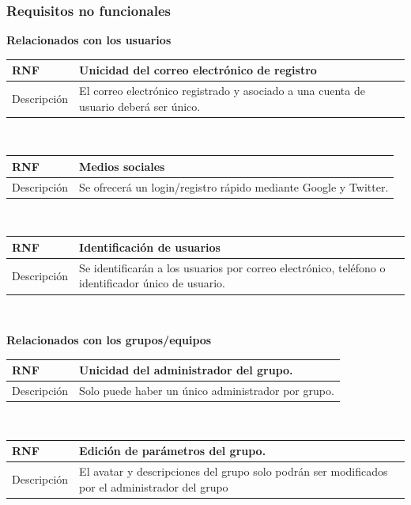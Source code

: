 \documentclass[twoside]{report}
\newcommand\addrow[2]{#1 &#2\\ }
\newcommand\addheading[2]{#1 &#2\\ \hline}
\newcommand\tabularhead{\begin{tabular}{lp{0.7\textwidth}}
\hline
}
\newenvironment{req}{\tabularhead}
{\hline\end{tabular}}
\begin{document}
\subsubsection{Requisitos no funcionales}



\textbf{Relacionados con los usuarios}\\

\begin{req}
	\addheading{\textbf{RNF\arabic{nonFunctionalRequirements}}}{Unicidad del correo electrónico de registro}
	\addrow{Descripción}{El correo electrónico registrado y asociado a una cuenta de usuario deberá ser único.}
\end{req}\\

\begin{req}
	\addheading{\textbf{RNF\arabic{nonFunctionalRequirements}}}{Medios sociales}
	\addrow{Descripción}{Se ofrecerá un login/registro rápido mediante Google y Twitter.}
\end{req}\\

\begin{req}
	\addheading{\textbf{RNF\arabic{nonFunctionalRequirements}}}{Identificación de usuarios}
	\addrow{Descripción}{Se identificarán a los usuarios por correo electrónico, teléfono o identificador único de usuario.}
\end{req}\\

\textbf{Relacionados con los grupos/equipos}\\

\begin{req}
	\addheading{\textbf{RNF\arabic{nonFunctionalRequirements}}}{Unicidad del administrador del grupo.}
	\addrow{Descripción}{Solo puede haber un único administrador por grupo.}
\end{req}\\

\begin{req}
	\addheading{\textbf{RNF\arabic{nonFunctionalRequirements}}}{Edición de parámetros del grupo.}
	\addrow{Descripción}{El avatar y descripciones del grupo solo podrán ser modificados por el administrador del grupo}
\end{req}\\
\end{document}
